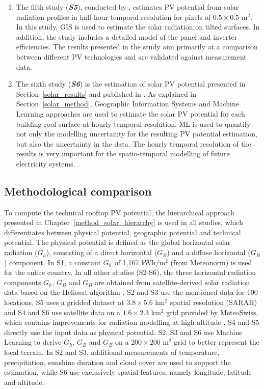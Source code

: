 \begin{enumerate}
\item The fifth study (\textbf{\textit{S5}}), conducted by \citet{buffat_scalable_2018}, estimates PV potential from solar radiation profiles in half-hour temporal resolution for pixels of $0.5 \times 0.5$ m$^2$. In this study, GIS is used to estimate the solar radiation on tilted surfaces. In addition, the study includes a detailed model of the panel and inverter efficiencies. The results presented in the study aim primarily at a comparison between different PV technologies and are validated against measurement data.
\item The sixth study (\textbf{\textit{S6}}) is the estimation of solar PV potential presented in Section~\ref{solar_results} and published in \cite{walch_big_2020}. As explained in Section~\ref{solar_method}, Geographic Information Systems and Machine Learning approaches are used to estimate the solar PV potential for each building roof surface at hourly temporal resolution. ML is used to quantify not only the modelling uncertainty for the resulting PV potential estimation, but also the uncertainty in the data. The hourly temporal resolution of the results is very important for the spatio-temporal modelling of future electricity systems.   
\end{enumerate}

\subsection{Methodological comparison}

To compute the technical rooftop PV potential, the hierarchical approach presented in Chapter~\ref{method_solar_hierarchy} is used in all studies, which differentiates between physical potential, geographic potential and technical potential.
%
The physical potential is defined as the global horizontal solar radiation ($G_h$), consisting of a direct horizontal ($G_B$) and a diffuse horizontal ($G_B$) component. In S1, a constant $G_h$ of 1,167 kWh/m$^2$ (from Meteonorm) is used for the entire country. In all other studies (S2-S6), the three horizontal radiation components $G_h$, $G_B$ and $G_B$ are obtained from satellite-derived solar radiation data based on the Heliosat algorithm \cite{rigollier_method_2004}. S2 and S3 use the mentioned data for 100 locations, S5 uses a gridded dataset at $3.8 \times 5.6$ km$^2$ spatial resolution (SARAH) and S4 and S6 use satellite data on a $1.6 \times 2.3$ km$^2$ grid provided by MeteoSwiss, which contains improvements for radiation modelling at high altitude \cite{stockli_heliomont_2017}. S4 and S5 directly use the input data as physical potential. S2, S3 and S6 use Machine Learning to derive $G_h$, $G_B$ and $G_B$ on a $200 \times 200$ m$^2$ grid to better represent the local terrain. In S2 and S3, additional measurements of temperature, precipitation, sunshine duration and cloud cover are used to support the estimation, while S6 use exclusively spatial features, namely longitude, latitude and altitude. 

